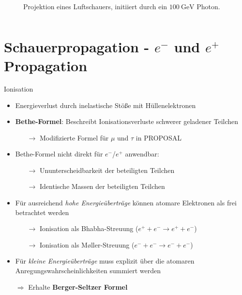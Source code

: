 \documentclass[aspectratio=1610, captions=tableheading, 11pt]{beamer}
\begin{document}
\begin{frame}
\begin{columns}
\begin{figure}
           \captionsetup{format=myformat}
          \caption*{Projektion eines Luftschauers, initiiert durch ein $\SI{100}{\giga\electronvolt}$ Photon\footnotemark.}
      \end{figure}
  \end{columns}
\end{frame}


\section{Schauerpropagation - $e^-$ und $e^+$ Propagation}


\begin{frame}{Ionisation}
	 \begin{itemize}
	 	\setlength\itemsep{0.5em}
	 	\item Energieverlust durch inelastische Stöße mit Hüllenelektronen
	 	\item \textbf{Bethe-Formel}: Beschreibt Ionisationsverluste schwerer geladener Teilchen
	 	\begin{itemize}
          \item[$\rightarrow$] Modifizierte Formel für $\mu$ und $\tau$ in PROPOSAL
	 	\end{itemize}
	 	\vspace{5mm}
	 	\item Bethe-Formel nicht direkt für $e^-$/$e^+$ anwendbar:
	 	\begin{itemize}
          \item[$\rightarrow$] Ununterscheidbarkeit der beteiligten Teilchen
          \item[$\rightarrow$] Identische Massen der beteiligten Teilchen
	 	\end{itemize}
	 \end{itemize}
\end{frame}


\begin{frame}
	 \begin{itemize}
	 	\setlength\itemsep{0.5em}
	 	\item Für ausreichend \emph{hohe Energieüberträge} können atomare Elektronen als frei betrachtet werden
	 	\begin{itemize}
          \item[$\rightarrow$] Ionisation als Bhabha-Streuung ($ e^+ + e^- \rightarrow e^+ + e^- $)
          \item[$\rightarrow$] Ionisation als Møller-Streuung ($ e^- + e^- \rightarrow e^- + e^- $)
	 	\end{itemize}
        \item Für \emph{kleine Energieüberträge} muss explizit über die atomaren Anregungswahrscheinlichkeiten summiert werden
		\item[$\Rightarrow$]Erhalte \textbf{Berger-Seltzer Formel}
	 \end{itemize}
\end{frame}
\end{document}
